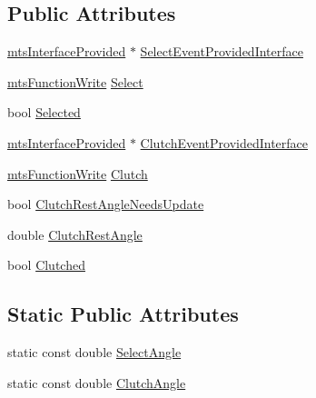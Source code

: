 \subsection*{Public Attributes}
\begin{DoxyCompactItemize}
\item 
\hyperlink{classmts_interface_provided}{mts\-Interface\-Provided} $\ast$ \hyperlink{classmts_intuitive_da_vinci_1_1_master_arm_data_ae0abfe69ca750c526f1e4b86bba2ac93}{Select\-Event\-Provided\-Interface}
\item 
\hyperlink{classmts_function_write}{mts\-Function\-Write} \hyperlink{classmts_intuitive_da_vinci_1_1_master_arm_data_a207b776ff47655c192af977ecdae64ca}{Select}
\item 
bool \hyperlink{classmts_intuitive_da_vinci_1_1_master_arm_data_a7e0c4a473c2ef763ab47513edb9dd8d8}{Selected}
\item 
\hyperlink{classmts_interface_provided}{mts\-Interface\-Provided} $\ast$ \hyperlink{classmts_intuitive_da_vinci_1_1_master_arm_data_acafce94f96ebf3bed4ab9e43e475054d}{Clutch\-Event\-Provided\-Interface}
\item 
\hyperlink{classmts_function_write}{mts\-Function\-Write} \hyperlink{classmts_intuitive_da_vinci_1_1_master_arm_data_a58792120331f67da36c3464363f8af74}{Clutch}
\item 
bool \hyperlink{classmts_intuitive_da_vinci_1_1_master_arm_data_a448d45cb9698ef91d19ba31742df8034}{Clutch\-Rest\-Angle\-Needs\-Update}
\item 
double \hyperlink{classmts_intuitive_da_vinci_1_1_master_arm_data_abbc2e4cac424cfc2faa487315e2dda65}{Clutch\-Rest\-Angle}
\item 
bool \hyperlink{classmts_intuitive_da_vinci_1_1_master_arm_data_a7f93e3793b9cb0cbd70ab1fba6f05342}{Clutched}
\end{DoxyCompactItemize}
\subsection*{Static Public Attributes}
\begin{DoxyCompactItemize}
\item 
static const double \hyperlink{classmts_intuitive_da_vinci_1_1_master_arm_data_af030ea2aa05d0a2b43cf2d68961a2601}{Select\-Angle}
\item 
static const double \hyperlink{classmts_intuitive_da_vinci_1_1_master_arm_data_a64ce985e23a0d56e77ea19d53d7e1148}{Clutch\-Angle}
\end{DoxyCompactItemize}


